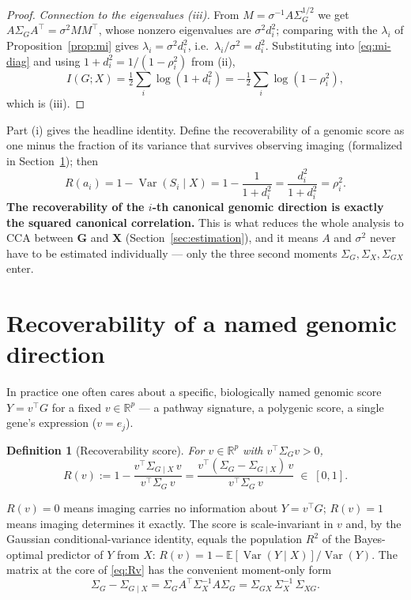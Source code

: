 \documentclass{article}
\newtheorem{definition}{Definition}
\newcommand{\R}{\mathbb{R}}
\newcommand{\E}{\mathbb{E}}
\newcommand{\Var}{\operatorname{Var}}
\newcommand{\Sg}{\Sigma_{G}}
\newcommand{\Sx}{\Sigma_{X}}
\newcommand{\Sgx}{\Sigma_{GX}}
\newcommand{\Sxg}{\Sigma_{XG}}
\newcommand{\Sgcx}{\Sigma_{G\mid X}}
\newcommand{\T}{^{\top}}
\begin{document}
\begin{proof}
\emph{Connection to the eigenvalues (iii).} From $M = \sigma^{-1}A\Sg^{1/2}$ we
get $A\Sg A\T = \sigma^2 M M\T$, whose nonzero eigenvalues are $\sigma^2 d_i^2$;
comparing with the $\lambda_i$ of Proposition~\ref{prop:mi} gives
$\lambda_i = \sigma^2 d_i^2$, i.e.\ $\lambda_i/\sigma^2 = d_i^2$. Substituting into
\eqref{eq:mi-diag} and using $1 + d_i^2 = 1/(1-\rho_i^2)$ from (ii),
\[
I(G;X)
= \tfrac12 \sum_i \log(1 + d_i^2)
= -\tfrac12 \sum_i \log(1 - \rho_i^2),
\]
which is (iii).
\end{proof}

Part (i) gives the headline identity. Define the recoverability of a genomic
score as one minus the fraction of its variance that survives observing imaging
(formalized in Section~\ref{sec:scores}); then
\begin{equation}
\boxed{\;R(a_i) = 1 - \Var(S_i \mid X) = 1 - \frac{1}{1+d_i^2} = \frac{d_i^2}{1+d_i^2} = \rho_i^2.\;}
\label{eq:R-rho}
\end{equation}
\textbf{The recoverability of the $i$-th canonical genomic direction is exactly
the squared canonical correlation.} This is what reduces the whole analysis to
CCA between $\mathbf{G}$ and $\mathbf{X}$ (Section~\ref{sec:estimation}), and it
means $A$ and $\sigma^2$ never have to be estimated individually --- only the
three second moments $\Sg, \Sx, \Sgx$ enter.

\section{Recoverability of a named genomic direction}
\label{sec:scores}

In practice one often cares about a specific, biologically named genomic score
$Y = v\T G$ for a fixed $v \in \R^p$ --- a pathway signature, a polygenic score,
a single gene's expression ($v = e_j$).

\begin{definition}[Recoverability score]
For $v \in \R^p$ with $v\T \Sg v > 0$,
\begin{equation}
R(v) := 1 - \frac{v\T \Sgcx\, v}{v\T \Sg\, v}
= \frac{v\T (\Sg - \Sgcx)\, v}{v\T \Sg\, v}
\;\in\; [0, 1].
\label{eq:Rv}
\end{equation}
\end{definition}

$R(v) = 0$ means imaging carries no information about $Y = v\T G$;
$R(v) = 1$ means imaging determines it exactly. The score is scale-invariant in
$v$ and, by the Gaussian conditional-variance identity, equals the population
$R^2$ of the Bayes-optimal predictor of $Y$ from $X$:
$R(v) = 1 - \E[\Var(Y \mid X)] / \Var(Y)$. The matrix at the core of
\eqref{eq:Rv} has the convenient moment-only form
\begin{equation}
\Sg - \Sgcx = \Sg A\T \Sx^{-1} A \Sg = \Sgx\, \Sx^{-1}\, \Sxg .
\label{eq:explained}
\end{equation}
\end{document}
